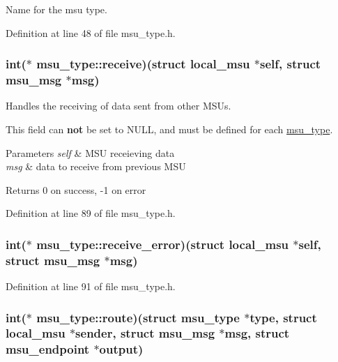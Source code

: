 Name for the msu type. 



Definition at line 48 of file msu\-\_\-type.\-h.

\hypertarget{structmsu__type_a8e80deeae69a39533061d4407fa7c53d}{
\subsubsection[{receive}]{\setlength{\rightskip}{0pt plus 5cm}int($\ast$ msu\-\_\-type\-::receive)(struct {\bf local\-\_\-msu} $\ast$self, struct {\bf msu\-\_\-msg} $\ast$msg)}}\label{structmsu__type_a8e80deeae69a39533061d4407fa7c53d}


Handles the receiving of data sent from other M\-S\-Us. 

This field can {\bfseries not} be set to N\-U\-L\-L, and must be defined for each \hyperlink{structmsu__type}{msu\-\_\-type}. 
\begin{DoxyParams}{Parameters}
{\em self} & M\-S\-U receieving data \\
\hline
{\em msg} & data to receive from previous M\-S\-U \\
\hline
\end{DoxyParams}
\begin{DoxyReturn}{Returns}
0 on success, -\/1 on error 
\end{DoxyReturn}


Definition at line 89 of file msu\-\_\-type.\-h.

\hypertarget{structmsu__type_af38fab3cdee8b622e0bb3594c1d7414b}{
\subsubsection[{receive\-\_\-error}]{\setlength{\rightskip}{0pt plus 5cm}int($\ast$ msu\-\_\-type\-::receive\-\_\-error)(struct {\bf local\-\_\-msu} $\ast$self, struct {\bf msu\-\_\-msg} $\ast$msg)}}\label{structmsu__type_af38fab3cdee8b622e0bb3594c1d7414b}


Definition at line 91 of file msu\-\_\-type.\-h.

\hypertarget{structmsu__type_ab076ecc00c1838c66351f51f9f2b684e}{
\subsubsection[{route}]{\setlength{\rightskip}{0pt plus 5cm}int($\ast$ msu\-\_\-type\-::route)(struct {\bf msu\-\_\-type} $\ast$type, struct {\bf local\-\_\-msu} $\ast$sender, struct {\bf msu\-\_\-msg} $\ast$msg, struct {\bf msu\-\_\-endpoint} $\ast$output)}}\label{structmsu__type_ab076ecc00c1838c66351f51f9f2b684e}


